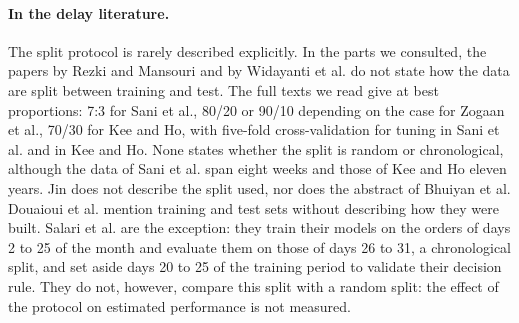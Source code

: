 \documentclass[11pt,a4paper]{article}
\theoremstyle{definition}
\begin{document}
\paragraph{In the delay literature.} The split protocol is rarely described explicitly. In the parts we consulted, the papers by Rezki and Mansouri and by Widayanti et al. do not state how the data are split between training and test. The full texts we read give at best proportions: 7:3 for Sani et al., 80/20 or 90/10 depending on the case for Zogaan et al., 70/30 for Kee and Ho, with five-fold cross-validation for tuning in Sani et al. and in Kee and Ho. None states whether the split is random or chronological, although the data of Sani et al. span eight weeks and those of Kee and Ho eleven years. Jin does not describe the split used, nor does the abstract of Bhuiyan et al. Douaioui et al. \cite{douaioui2024enhancing} mention training and test sets without describing how they were built. Salari et al. \cite{salari2022realtime} are the exception: they train their models on the orders of days 2 to 25 of the month and evaluate them on those of days 26 to 31, a chronological split, and set aside days 20 to 25 of the training period to validate their decision rule. They do not, however, compare this split with a random split: the effect of the protocol on estimated performance is not measured.
\end{document}
